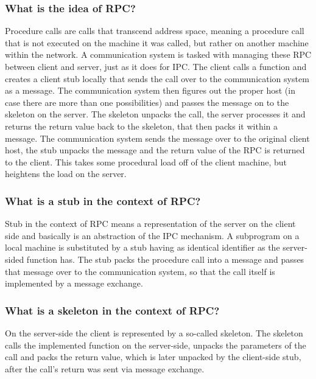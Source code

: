 \documentclass[12pt, a4paper]{article}
\begin{document}
\subsubsection*{What is the idea of RPC?}
Procedure calls are calls that transcend address space, meaning a procedure call that is not executed on the machine it 
was called, but rather on another machine within the network. A communication system is tasked with managing these 
RPC between client and server, just as it does for IPC. The client calls a function and creates a client stub locally 
that sends the call over to the communication system as a message. The communication system then figures out the proper 
host (in case there are more than one possibilities) and passes the message on to the skeleton on the server. The 
skeleton unpacks the call, the server processes it and returns the return value back to the skeleton, that then packs 
it within a message. The communication system sends the message over to the original client host, the stub unpacks the 
message and the return value of the RPC is returned to the client. This takes some procedural load off of the client 
machine, but heightens the load on the server.
\subsubsection*{What is a stub in the context of RPC?}
Stub in the context of RPC means a representation of the server on the client side and basically is an abstraction 
of the IPC mechanism. A subprogram on a local machine is substituted by a stub having as identical identifier 
as the server-sided function has. The stub packs the procedure call into a message and passes that message over to 
the communication system, so that the call itself is implemented by a message exchange.
\subsubsection*{What is a skeleton in the context of RPC?}
On the server-side the client is represented by a so-called skeleton. The skeleton calls the implemented function 
on the server-side, unpacks the parameters of the call and packs the return value, which is later unpacked by the 
client-side stub, after the call's return was sent via message exchange.
\end{document}
